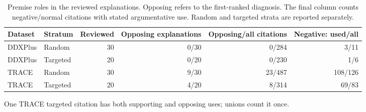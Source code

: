 \begin{table}[!tbp]\centering\footnotesize\setlength{\tabcolsep}{4pt}
\caption{Premise roles in the reviewed explanations. Opposing refers to the first-ranked diagnosis. The final column counts negative/normal citations with stated argumentative use. Random and targeted strata are reported separately.}
\label{tab:role-census}
\begin{tabular}{llrrrr}\toprule
Dataset & Stratum & Reviewed & Opposing explanations & Opposing/all citations & Negative: used/all\\\midrule
DDXPlus & Random & 30 & 0/30 & 0/284 & 3/11\\
DDXPlus & Targeted & 20 & 0/20 & 0/230 & 1/6\\
TRACE & Random & 30 & 9/30 & 23/487 & 108/126\\
TRACE & Targeted & 20 & 4/20 & 8/314 & 69/83\\\bottomrule
\end{tabular}
\par\smallskip\raggedright One TRACE targeted citation has both supporting and opposing uses; unions count it once.
\end{table}
